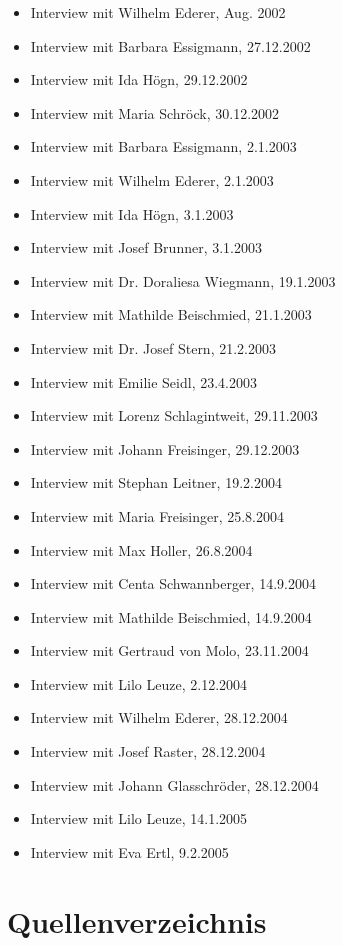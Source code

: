 \documentclass{book}
\begin{document}
\begin{itemize}
\item Interview mit Wilhelm Ederer, Aug. 2002
\item Interview mit Barbara Essigmann, 27.12.2002
\item Interview mit Ida Högn, 29.12.2002
\item Interview mit Maria Schröck, 30.12.2002
\item Interview mit Barbara Essigmann, 2.1.2003
\item Interview mit Wilhelm Ederer, 2.1.2003
\item Interview mit Ida Högn, 3.1.2003
\item Interview mit Josef Brunner, 3.1.2003
\item Interview mit Dr. Doraliesa Wiegmann, 19.1.2003
\item Interview mit Mathilde Beischmied, 21.1.2003
\item Interview mit Dr. Josef Stern, 21.2.2003
\item Interview mit Emilie Seidl, 23.4.2003
\item Interview mit Lorenz Schlagintweit, 29.11.2003
\item Interview mit Johann Freisinger, 29.12.2003
\item Interview mit Stephan Leitner, 19.2.2004
\item Interview mit Maria Freisinger, 25.8.2004
\item Interview mit Max Holler, 26.8.2004
\item Interview mit Centa Schwannberger, 14.9.2004
\item Interview mit Mathilde Beischmied, 14.9.2004
\item Interview mit Gertraud von Molo, 23.11.2004
\item Interview mit Lilo Leuze, 2.12.2004
\item Interview mit Wilhelm Ederer, 28.12.2004
\item Interview mit Josef Raster, 28.12.2004
\item Interview mit Johann Glasschröder, 28.12.2004
\item Interview mit Lilo Leuze, 14.1.2005
\item Interview mit Eva Ertl, 9.2.2005
\end{itemize}

\section{Quellenverzeichnis}
\end{document}

